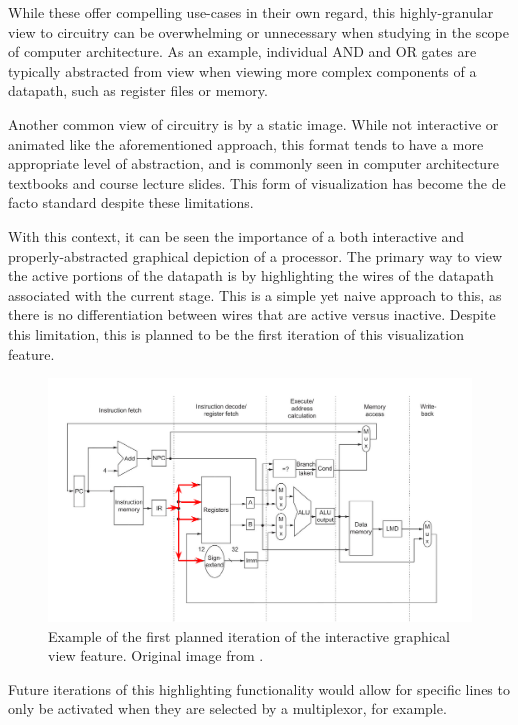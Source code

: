 \documentclass[
    paper=letter,
    parskip=half,
    fontsize=12pt,
    titlepage=firstiscover,
    toc=bibliography,
    numbers=endperiod
]{scrartcl}
\begin{document}
While these offer compelling use-cases in their own regard, this
highly-granular view to circuitry can be overwhelming or unnecessary
when studying in the scope of computer architecture. As an example,
individual AND and OR gates are typically abstracted from view when
viewing more complex components of a datapath, such as register files or
memory.

Another common view of circuitry is by a static image. While not
interactive or animated like the aforementioned approach, this format
tends to have a more appropriate level of abstraction, and is commonly
seen in computer architecture textbooks and course lecture slides. This
form of visualization has become the de facto standard despite these
limitations.

With this context, it can be seen the importance of a both interactive
and properly-abstracted graphical depiction of a processor. The primary
way to view the active portions of the datapath is by highlighting the
wires of the datapath associated with the current stage. This is a
simple yet naive approach to this, as there is no differentiation
between wires that are active versus inactive. Despite this limitation,
this is planned to be the first iteration of this visualization feature.

\begin{figure}[H]
    \includegraphics[width=\textwidth]{mips-graphical-view-staging}
    \caption{Example of the first planned iteration of the interactive graphical view feature. Original image from \protect\cite[p.~287]{hennessy-patterson}.}
\end{figure}

Future iterations of this highlighting functionality would allow for
specific lines to only be activated when they are selected by a
multiplexor, for example.
\end{document}
